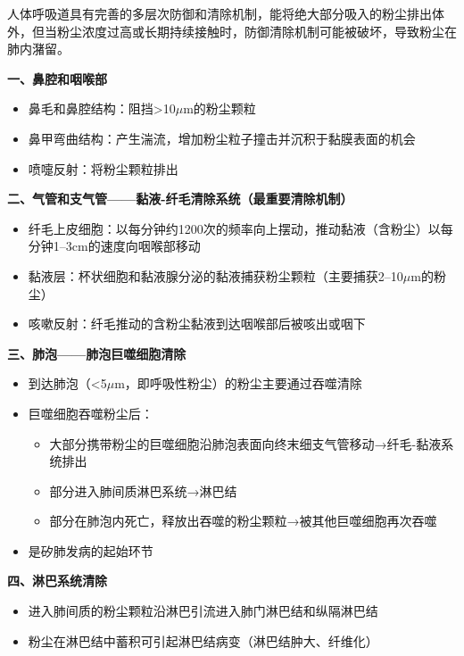 \begin{keybox}
人体呼吸道具有完善的多层次防御和清除机制，能将绝大部分吸入的粉尘排出体外，但当粉尘浓度过高或长期持续接触时，防御清除机制可能被破坏，导致粉尘在肺内潴留。

\textbf{一、鼻腔和咽喉部}
\begin{itemize}[leftmargin=*]
    \item 鼻毛和鼻腔结构：阻挡>10$\mu$m的粉尘颗粒
    \item 鼻甲弯曲结构：产生湍流，增加粉尘粒子撞击并沉积于黏膜表面的机会
    \item 喷嚏反射：将粉尘颗粒排出
\end{itemize}

\textbf{二、气管和支气管——黏液-纤毛清除系统（最重要清除机制）}
\begin{itemize}[leftmargin=*]
    \item 纤毛上皮细胞：以每分钟约1200次的频率向上摆动，推动黏液（含粉尘）以每分钟1--3cm的速度向咽喉部移动
    \item 黏液层：杯状细胞和黏液腺分泌的黏液捕获粉尘颗粒（主要捕获2--10$\mu$m的粉尘）
    \item 咳嗽反射：纤毛推动的含粉尘黏液到达咽喉部后被咳出或咽下
\end{itemize}

\textbf{三、肺泡——肺泡巨噬细胞清除}
\begin{itemize}[leftmargin=*]
    \item 到达肺泡（<5$\mu$m，即呼吸性粉尘）的粉尘主要通过吞噬清除
    \item 巨噬细胞吞噬粉尘后：
    \begin{itemize}
        \item 大部分携带粉尘的巨噬细胞沿肺泡表面向终末细支气管移动→纤毛-黏液系统排出
        \item 部分进入肺间质淋巴系统→淋巴结
        \item 部分在肺泡内死亡，释放出吞噬的粉尘颗粒→被其他巨噬细胞再次吞噬
    \end{itemize}
    \item {}是矽肺发病的起始环节
\end{itemize}

\textbf{四、淋巴系统清除}
\begin{itemize}[leftmargin=*]
    \item 进入肺间质的粉尘颗粒沿淋巴引流进入肺门淋巴结和纵隔淋巴结
    \item 粉尘在淋巴结中蓄积可引起淋巴结病变（淋巴结肿大、纤维化）
\end{itemize}


\end{keybox}
